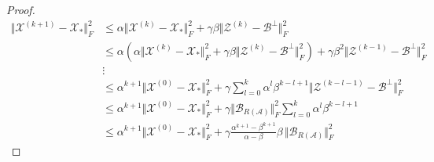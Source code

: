 \documentclass[11pt]{article}
\def\fm#1{\mathcal{#1}}
\def \x#1{\fm X^{(#1)}}
\begin{document}
\begin{proof}
\begin{align*}
    \Vert \x{k+1} - \fm X_\ast \Vert_F^2  & \leq \alpha  \Vert \x k - \fm X_\ast \Vert_F^2 + \gamma\beta \Vert \fm Z^{(k)} - \fm B^\perp \Vert_F^2\\
    & \leq \alpha \left( \alpha  \Vert \x k - \fm X_\ast \Vert_F^2 + \gamma\beta \Vert \fm Z^{(k)} - \fm B^\perp \Vert_F^2 \right) + \gamma\beta^2 \Vert \fm Z^{(k-1)} - \fm B^\perp \Vert_F^2\\
    &\vdots\\
    & \leq \alpha^{k+1} \Vert \x 0 - \fm X_\ast \Vert_F^2  + \gamma\sum_{l=0}^k \alpha^{l} \beta^{k-l+1}  \Vert \fm Z^{(k-l-1)} - \fm B^\perp \Vert_F^2\\
    & \leq \alpha^{k+1} \Vert \x 0 - \fm X_\ast \Vert_F^2  + \gamma\Vert \fm B_{R(\fm A)}\Vert_F^2 \sum_{l=0}^k \alpha^{l} \beta^{k-l+1}\\
    &\leq \alpha^{k+1} \Vert \x 0 - \fm X_\ast \Vert_F^2 + \gamma\frac{\alpha^{k+1} -\beta^{k+1}}{\alpha - \beta} \beta\,\Vert \fm B_{R(\fm A)}\Vert_F^2
\end{align*}
\end{proof}


\end{document}
